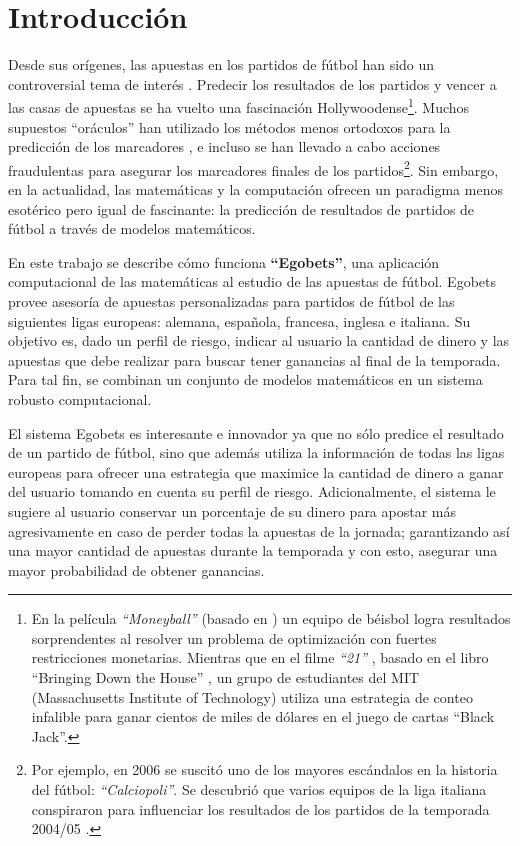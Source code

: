 \chapter{Introducción}\label{chap:introduccion}

Desde sus orígenes, las apuestas en los partidos de fútbol han sido un controversial tema de interés \cite{udovicic1998special}. Predecir los resultados de los partidos y vencer a las casas de apuestas se ha vuelto una fascinación Hollywoodense\footnote{En la película \emph{``Moneyball''} \cite{moneyball} (basado en \cite{lewis2004moneyball}) un equipo de béisbol logra resultados sorprendentes al resolver un problema de optimización con fuertes restricciones monetarias. Mientras que en el filme \emph{``21''} \cite{21Movie}, basado en el libro ``Bringing Down the House'' \cite{patrick2008bringing}, un grupo de estudiantes del MIT (Massachusetts Institute of Technology) utiliza una estrategia de conteo infalible para ganar cientos de miles de dólares en el juego de cartas ``Black Jack''.}. Muchos supuestos ``oráculos'' han utilizado los métodos menos ortodoxos para la predicción de los marcadores \cite{prevos2010psychic}, e incluso se han llevado a cabo acciones fraudulentas para asegurar los marcadores finales de los partidos\footnote{Por ejemplo, en 2006 se suscitó uno de los mayores escándalos en la historia del fútbol: \emph{``Calciopoli''}. Se descubrió que varios equipos de la liga italiana conspiraron para influenciar los resultados de los partidos de la temporada 2004/05 \cite{distaso2008corruption}.}. Sin embargo, en la actualidad, las matemáticas y la computación ofrecen un paradigma menos esotérico pero igual de fascinante: la predicción de resultados de partidos de fútbol a través de modelos matemáticos.

En este trabajo se describe cómo funciona \textbf{``Egobets''}, una aplicación computacional de las matemáticas al estudio de las apuestas de fútbol. Egobets provee asesoría de apuestas personalizadas para partidos de fútbol de las siguientes ligas europeas: alemana, española, francesa, inglesa e italiana. Su objetivo es, dado un perfil de riesgo, indicar al usuario la cantidad de dinero y las apuestas que debe realizar para buscar tener ganancias al final de la temporada. Para tal fin, se combinan un conjunto de modelos matemáticos en un sistema robusto computacional.

El sistema Egobets es interesante e innovador ya que no sólo predice el resultado de un partido de fútbol, sino que además utiliza la información de todas las ligas europeas para ofrecer una estrategia que maximice la cantidad de dinero a ganar del usuario tomando en cuenta su perfil de riesgo. Adicionalmente, el sistema le sugiere al usuario conservar un porcentaje de su dinero para apostar más agresivamente en caso de perder todas la apuestas de la jornada; garantizando así una mayor cantidad de apuestas durante la temporada y con esto, asegurar una mayor probabilidad de obtener ganancias.

